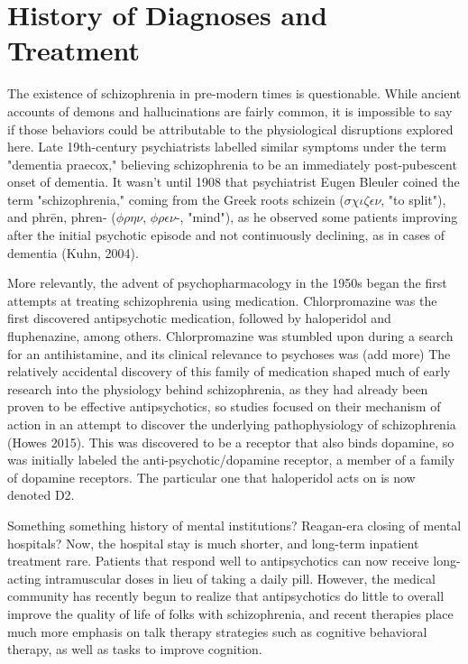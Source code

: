 \documentclass[12pt,twoside]{reedthesis}
\begin{document}
	\section{History of Diagnoses and Treatment}
	The existence of schizophrenia in pre-modern times is questionable. While ancient accounts of demons and hallucinations are fairly common, it is impossible to say if those behaviors could be attributable to the physiological disruptions explored here. Late 19th-century psychiatrists labelled similar symptoms under the term "dementia praecox," believing schizophrenia to be an immediately post-pubescent onset of dementia. It wasn't until 1908 that psychiatrist Eugen Bleuler coined the term "schizophrenia," coming from the Greek roots schizein ($\sigma \chi \iota \zeta \epsilon \nu$, "to split"), and phr\=en, phren- ($\phi \rho \eta \nu$, $\phi \rho \epsilon \nu$-, "mind"), as he observed some patients improving after the initial psychotic episode and not continuously declining, as in cases of dementia (Kuhn, 2004). 
	
	More relevantly, the advent of psychopharmacology in the 1950s began the first attempts at treating schizophrenia using medication. Chlorpromazine was the first discovered antipsychotic medication, followed by haloperidol and fluphenazine, among others. Chlorpromazine was stumbled upon during a search for an antihistamine, and its clinical relevance to psychoses was (add more) The relatively accidental discovery of this family of medication shaped much of early research into the physiology behind schizophrenia, as they had already been proven to be effective antipsychotics, so studies focused on their mechanism of action in an attempt to discover the underlying pathophysiology of schizophrenia (Howes 2015). This was discovered to be a receptor that also binds dopamine, so was initially labeled the anti-psychotic/dopamine receptor, a member of a family of dopamine receptors. The particular one that haloperidol acts on is now denoted D2. 
		
	Something something history of mental institutions? 
	Reagan-era closing of mental hospitals? 
	Now, the hospital stay is much shorter, and long-term inpatient treatment rare. Patients that respond well to antipsychotics can now receive long-acting intramuscular doses in lieu of taking a daily pill. However, the medical community has recently begun to realize that antipsychotics do little to overall improve the quality of life of folks with schizophrenia, and recent therapies place much more emphasis on talk therapy strategies such as cognitive behavioral therapy, as well as tasks to improve cognition. 
	
\end{document}
